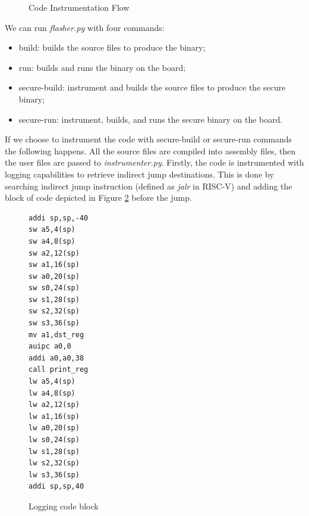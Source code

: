 \begin{figure}[htbp]
  \centering
  \def\stackalignment{r} %
  {\scriptsize }
  \caption{Code Instrumentation Flow}
  \label{fig:instrumentation}
\end{figure}

We can run \textit{flasher.py} with four commands:
\begin{itemize}[noitemsep]
  \item build: builds the source files to produce the binary;

  \item run: builds and runs the binary on the board;

  \item secure-build: instrument and builds the source files to produce the
    secure binary;

  \item secure-run: instrument, builds, and runs the secure binary on the board.
\end{itemize}

If we choose to instrument the code with secure-build or secure-run commands the
following happens. All the source files are compiled into assembly files, then
the user files are passed to \textit{instrumenter.py}. Firstly, the code is instrumented
with logging capabilities to retrieve indirect jump destinations. This is done
by searching indirect jump instruction (defined as \textit{jalr} in RISC-V) and adding
the block of code depicted in Figure \ref{fig:loggingblock} before the jump.

\begin{figure}
  \setlength{\intextsep}{0pt}
  \begin{minipage}{0.25\textwidth}
    \begin{lstlisting}
addi sp,sp,-40
sw a5,4(sp)
sw a4,8(sp)
sw a2,12(sp)
sw a1,16(sp)
sw a0,20(sp)
sw s0,24(sp)
sw s1,28(sp)
sw s2,32(sp)
sw s3,36(sp)
mv a1,dst_reg
auipc a0,0
addi a0,a0,38
call print_reg
lw a5,4(sp)
lw a4,8(sp)
lw a2,12(sp)
lw a1,16(sp)
lw a0,20(sp)
lw s0,24(sp)
lw s1,28(sp)
lw s2,32(sp)
lw s3,36(sp)
addi sp,sp,40
\end{lstlisting}
  \end{minipage}
  \caption{Logging code block}
  \label{fig:loggingblock}
\end{figure}

